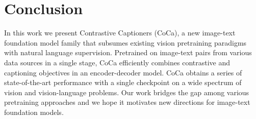 \section{Conclusion}
In this work we present Contrastive Captioners (CoCa),
a new image-text foundation model family that subsumes existing vision pretraining paradigms with natural language supervision.
Pretrained on image-text pairs from various data sources in a single stage,
CoCa efficiently combines contrastive and captioning objectives in an encoder-decoder model.
CoCa obtains a series of state-of-the-art performance with a single checkpoint on a wide spectrum of vision and vision-language problems.
Our work bridges the gap among various pretraining approaches and 
we hope it motivates new directions for image-text foundation models.